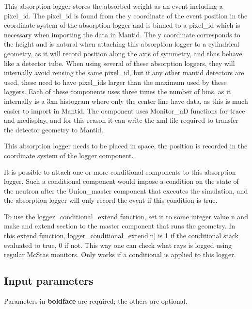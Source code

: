 This absorption logger stores the absorbed weight as an event including a pixel\_id. The pixel\_id is found from the y coordinate of the event position in the coordinate system of the absorption logger and is binned to a pixel\_id which is necessary when importing the data in Mantid. The y coordinate corresponds to the height and is natural when attaching this absorption logger to a cylindrical geometry, as it will record position along the axis of symmetry, and thus behave like a detector tube. When using several of these absorption loggers, they will internally avoid reusing the same pixel\_id, but if any other mantid detectors are used, these need to have pixel\_ids larger than the maximum used by these loggers. Each of these components uses three times the number of bins, as it internally is a 3xn histogram where only the center line have data, as this is much easier to import in Mantid. The ocmponent uses Monitor\_nD functions for trace and mcdisplay, and for this reason it can write the xml file required to transfer the detector geometry to Mantid.

This absorption logger needs to be placed in space, the position is recorded in the coordinate system of the logger component.

It is possible to attach one or more conditional components to this absorption logger. Such a conditional component would impose a condition on the state of the neutron after the Union\_master component that executes the simulation, and the absorption logger will only record the event if this condition is true.

To use the logger\_conditional\_extend function, set it to some integer value n and make and extend section to the master component that runs the geometry. In this extend function, logger\_conditional\_extend[n] is 1 if the conditional stack evaluated to true, 0 if not. This way one can check what rays is logged using regular McStas monitors. Only works if a conditional is applied to this logger.

\subsection*{Input parameters}
Parameters in \textbf{boldface} are required; the others are optional.

